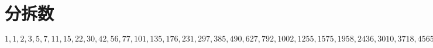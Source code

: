 \section{分拆数}

$1,1,2,3,5,7,11,15,22,30,42,56,77,101,135,176,231,297,385,490,627,792,1002,1255,1575,1958,2436,3010,3718,4565,5604,6842,8349,10143,12310,14883,17977,21637,26015,31185,37338,44583,53174,63261,75175,89134,105558,124754,147273,173525,204226,239943,281589,329931,386155,451276,526823,614154,715220,831820,966467,1121505,1300156,1505499,1741630,2012558,2323520,2679689,3087735,3554345,4087968,4697205,5392783,6185689,7089500,8118264,9289091,10619863,12132164,13848650,15796476,18004327,20506255,23338469,26543660,30167357,34262962,38887673,44108109,49995925,56634173,64112359,72533807,82010177,92669720,104651419,118114304,133230930,150198136,169229875,190569292$